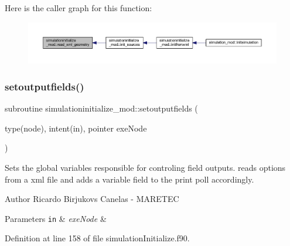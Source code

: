 Here is the caller graph for this function\+:\nopagebreak
\begin{figure}[H]
\begin{center}
\leavevmode
\includegraphics[width=350pt]{namespacesimulationinitialize__mod_ab65ac868a57f2cc124ec29f87a239424_icgraph}
\end{center}
\end{figure}
\mbox{\label{namespacesimulationinitialize__mod_a09174fb4527277943700a5509de326dd}} 
\subsubsection{\texorpdfstring{setoutputfields()}{setoutputfields()}}
{\footnotesize\ttfamily subroutine simulationinitialize\+\_\+mod\+::setoutputfields (\begin{DoxyParamCaption}\item[{type(node), intent(in), pointer}]{exe\+Node }\end{DoxyParamCaption})\hspace{0.3cm}{\ttfamily [private]}}



Sets the global variables responsible for controling field outputs. reads options from a xml file and adds a variable field to the print poll accordingly. 

\begin{DoxyAuthor}{Author}
Ricardo Birjukovs Canelas -\/ M\+A\+R\+E\+T\+EC 
\end{DoxyAuthor}

\begin{DoxyParams}[1]{Parameters}
\mbox{\tt in}  & {\em exe\+Node} & \\
\hline
\end{DoxyParams}


Definition at line 158 of file simulation\+Initialize.\+f90.


